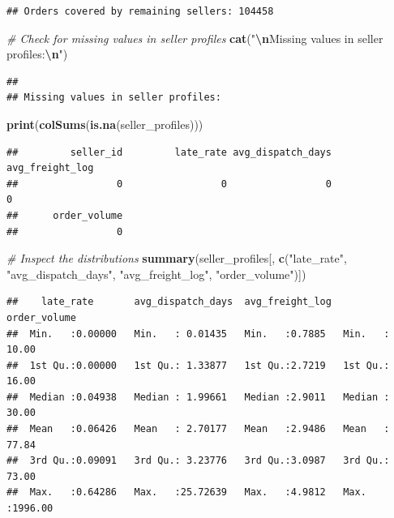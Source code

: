 \documentclass[
]{article}
\newenvironment{Shaded}{\begin{snugshade}}{\end{snugshade}}
\newcommand{\CommentTok}[1]{\textcolor[rgb]{0.56,0.35,0.01}{\textit{#1}}}
\newcommand{\FunctionTok}[1]{\textcolor[rgb]{0.13,0.29,0.53}{\textbf{#1}}}
\newcommand{\NormalTok}[1]{#1}
\newcommand{\SpecialCharTok}[1]{\textcolor[rgb]{0.81,0.36,0.00}{\textbf{#1}}}
\newcommand{\StringTok}[1]{\textcolor[rgb]{0.31,0.60,0.02}{#1}}
\begin{document}
\begin{verbatim}
## Orders covered by remaining sellers: 104458
\end{verbatim}

\begin{Shaded}
\begin{Highlighting}[]
\CommentTok{\# Check for missing values in seller profiles}
\FunctionTok{cat}\NormalTok{(}\StringTok{"}\SpecialCharTok{\textbackslash{}n}\StringTok{Missing values in seller profiles:}\SpecialCharTok{\textbackslash{}n}\StringTok{"}\NormalTok{)}
\end{Highlighting}
\end{Shaded}

\begin{verbatim}
## 
## Missing values in seller profiles:
\end{verbatim}

\begin{Shaded}
\begin{Highlighting}[]
\FunctionTok{print}\NormalTok{(}\FunctionTok{colSums}\NormalTok{(}\FunctionTok{is.na}\NormalTok{(seller\_profiles)))}
\end{Highlighting}
\end{Shaded}

\begin{verbatim}
##         seller_id         late_rate avg_dispatch_days   avg_freight_log 
##                 0                 0                 0                 0 
##      order_volume 
##                 0
\end{verbatim}

\begin{Shaded}
\begin{Highlighting}[]
\CommentTok{\# Inspect the distributions}
\FunctionTok{summary}\NormalTok{(seller\_profiles[, }\FunctionTok{c}\NormalTok{(}\StringTok{"late\_rate"}\NormalTok{, }\StringTok{"avg\_dispatch\_days"}\NormalTok{, }
                              \StringTok{"avg\_freight\_log"}\NormalTok{, }\StringTok{"order\_volume"}\NormalTok{)])}
\end{Highlighting}
\end{Shaded}

\begin{verbatim}
##    late_rate       avg_dispatch_days  avg_freight_log   order_volume    
##  Min.   :0.00000   Min.   : 0.01435   Min.   :0.7885   Min.   :  10.00  
##  1st Qu.:0.00000   1st Qu.: 1.33877   1st Qu.:2.7219   1st Qu.:  16.00  
##  Median :0.04938   Median : 1.99661   Median :2.9011   Median :  30.00  
##  Mean   :0.06426   Mean   : 2.70177   Mean   :2.9486   Mean   :  77.84  
##  3rd Qu.:0.09091   3rd Qu.: 3.23776   3rd Qu.:3.0987   3rd Qu.:  73.00  
##  Max.   :0.64286   Max.   :25.72639   Max.   :4.9812   Max.   :1996.00
\end{verbatim}
\end{document}
